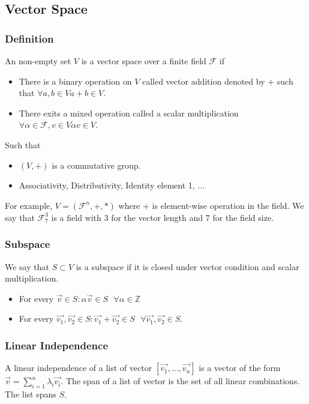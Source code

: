 \documentclass{article}
\begin{document}
\subsection{Vector Space}
\subsubsection{Definition} An non-empty set $ V $ is a vector space over a finite field $ \mathcal{F} $ if
\begin{itemize}
\item There is a binary operation on $ V $ called vector addition denoted by $ + $ such that $ \forall a,b \in V a + b \in V $.
\item There exits a mixed operation called a scalar multiplication $ \forall \alpha \in \mathcal{F}, v \in V \alpha v \in V $.
\end{itemize}
Such that
\begin{itemize}
\item $ (V, +) $ is a commutative group.
\item Associativity, Distributivity, Identity element 1, ...
\end{itemize}
For example, $ V = (\mathcal{F}^n, +, *) $ where $ + $ is element-wise operation in the field. We say that $ \mathcal{F}^{3}_{7} $ is a field with 3 for the vector length and 7 for the field size.

\subsubsection{Subspace}
We say that $ S \subset V $ is a subspace if it is closed under vector condition and scalar multiplication.
\begin{itemize}
\item For every $ \vec{v} \in S : \alpha\vec{v} \in S \textit{  } \forall \alpha \in \mathbb{Z} $
\item For every $ \vec{v_1},\vec{v_2} \in S : \vec{v_1} + \vec{v_2} \in S \textit{  } \forall \vec{v_1},\vec{v_2} \in S $.
\end{itemize}

\subsubsection{Linear Independence}
A linear independence of a list of vector $ [\vec{v_1},...,\vec{v_n}] $ is a vector of the form $ \vec{v} = \sum_{i=1}^{n} \lambda_i\vec{v_i} $. The span of a list of vector is the set of all linear combinations. The list spans $ S $.
\end{document}
